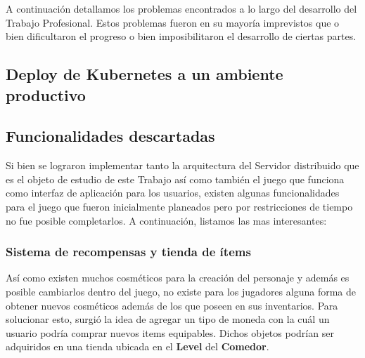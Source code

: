 
\noindent A continuación detallamos los problemas encontrados a lo largo del desarrollo del
Trabajo Profesional. Estos problemas fueron en su mayoría imprevistos que o bien
dificultaron el progreso o bien imposibilitaron el desarrollo de ciertas partes.

\subsection{Deploy de Kubernetes a un ambiente productivo}

\subsection{Funcionalidades descartadas}

Si bien se lograron implementar tanto la arquitectura del Servidor distribuido que es el objeto
de estudio de este Trabajo así como también el juego que funciona como interfaz de aplicación
para los usuarios, existen algunas funcionalidades para el juego que fueron inicialmente
planeados pero por restricciones de tiempo no fue posible completarlos. A continuación, listamos 
las mas interesantes:

\subsubsection{Sistema de recompensas y tienda de ítems}

\noindent Así como existen muchos cosméticos para la creación del personaje y además es posible cambiarlos dentro del
juego, no existe para los jugadores alguna forma de obtener nuevos cosméticos además de los que poseen en sus
inventarios. Para solucionar esto, surgió la idea de agregar un tipo de moneda con la cuál un usuario podría comprar nuevos
items equipables. Dichos objetos podrían ser adquiridos en una tienda ubicada en el \textbf{Level} del \textbf{Comedor}.

